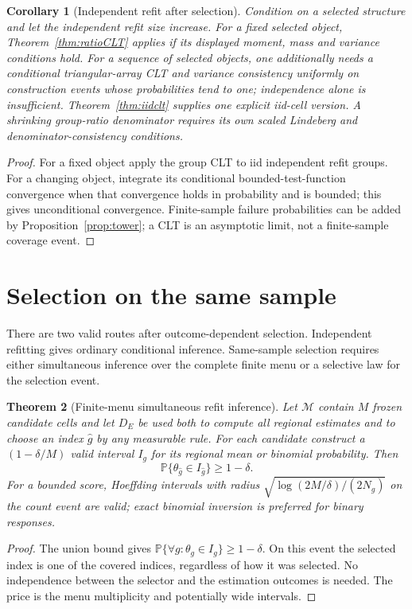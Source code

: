 \documentclass[11pt,a4paper]{article}
\numberwithin{equation}{section}
\newtheorem{theorem}{Theorem}[section]
\newtheorem{corollary}[theorem]{Corollary}
\theoremstyle{definition}\newtheorem{definition}[theorem]{Definition}
\theoremstyle{remark}\newtheorem{remark}[theorem]{Remark}
\begin{document}
\begin{corollary}[Independent refit after selection]\label{cor:refit}
Condition on a selected structure and let the independent refit size increase.
For a fixed selected object, Theorem~\ref{thm:ratioCLT} applies if its displayed
moment, mass and variance conditions hold. For a sequence of selected objects,
one additionally needs a conditional triangular-array CLT and variance
consistency uniformly on construction events whose probabilities tend to one;
independence alone is insufficient. Theorem~\ref{thm:iidclt} supplies one explicit
iid-cell version. A shrinking group-ratio denominator requires its own scaled
Lindeberg and denominator-consistency conditions.
\end{corollary}
\begin{proof}
For a fixed object apply the group CLT to iid independent refit groups. For a
changing object, integrate its conditional bounded-test-function convergence
when that convergence holds in probability and is bounded; this gives
unconditional convergence. Finite-sample failure probabilities can be added by
Proposition~\ref{prop:tower}; a CLT is an asymptotic limit, not a finite-sample
coverage event.\end{proof}

\section{Selection on the same sample}\label{sec:selective}
There are two valid routes after outcome-dependent selection. Independent refitting gives ordinary conditional inference. Same-sample selection requires either simultaneous inference over the complete finite menu or a selective law for the selection event.

\begin{theorem}[Finite-menu simultaneous refit inference]\label{thm:simul}
Let $\mathcal M$ contain $M$ frozen candidate cells and let $D_E$ be used both to compute all regional estimates and to choose an index $\hat g$ by any measurable rule. For each candidate construct a $(1-\delta/M)$ valid interval $I_g$ for its regional mean or binomial probability. Then
\[
 \mathbb P\{\theta_{\hat g}\in I_{\hat g}\}\ge1-\delta.
\]
For a bounded score, Hoeffding intervals with radius
$\sqrt{\log(2M/\delta)/(2N_g)}$ on the count event are valid; exact binomial inversion is preferred for binary responses.
\end{theorem}
\begin{proof}
The union bound gives $\mathbb P\{\forall g:\theta_g\in I_g\}\ge1-\delta$. On this event the selected index is one of the covered indices, regardless of how it was selected. No independence between the selector and the estimation outcomes is needed. The price is the menu multiplicity and potentially wide intervals.
\end{proof}
\end{document}
